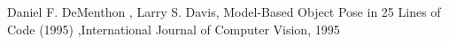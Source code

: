 \documentclass[letterpaper, 10 pt, conference]{ieeeconf}  %
\begin{document}







\begin{thebibliography}{99}

   Daniel F. DeMenthon , Larry S. Davis, Model-Based Object Pose in 25 Lines of Code (1995) ,International Journal of Computer Vision, 1995
 \end{thebibliography}
\end{document}

